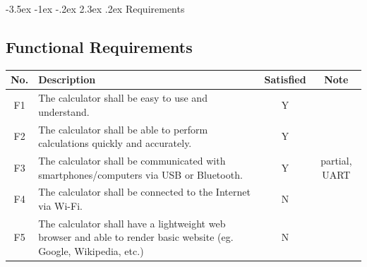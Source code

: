 \documentclass[a4paper, twoside]{report}
\makeatletter
\renewcommand\section{\@startsection {section}{1}{-1em}%
  {-3.5ex \@plus -1ex \@minus -.2ex}%
  {2.3ex \@plus.2ex}%
  {\normalfont\Large\bfseries}}
\makeatother
\begin{document}
\section{Requirements}
\subsection{Functional Requirements}
\begin{table}[H]
\centering
\begin{tabular}{|c{}|p{}|c{}|c{}|}
\hline
\textbf{No.} & \textbf{Description} & \textbf{Satisfied} & \textbf{Note} \\ \hline
F1  & The calculator shall be easy to use and understand.                                                                                                                                                                                                                                                                                                                         & Y                     &  \\ \hline
F2  & The calculator shall be able to perform calculations quickly and accurately.                                                                                                                                                                                                                                                                                                & Y                     &  \\ \hline
F3  & The calculator shall be communicated with smartphones/computers via USB or Bluetooth.                                                                                                                                                                                                                                                                                       & Y                     & partial, UART \\ \hline
F4  & The calculator shall be connected to the Internet via Wi-Fi.                                                                                                                                                                                                                                                                                                                & N                     &  \\ \hline
F5  & The calculator shall have a lightweight web browser and able to render basic website (eg. Google, Wikipedia, etc.)                                                                                                                                                                                                                                                          & N                     &  \\ \hline

\end{tabular}
\end{table}
\end{document}
